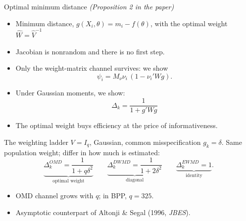 \documentclass[11pt,aspectratio=169]{beamer}
\begin{document}
\begin{frame}{Optimal minimum distance}
    \hypertarget{jump:p2}{}
    {\small\itshape (Proposition 2 in the paper)}\par\vspace{0.3em}
    \begin{itemize}\setlength{\itemsep}{0.7em}
    	\item Minimum distance, $g(X_i,\theta)=m_i-f(\theta)$, with the optimal weight
    	$\widehat W=\widehat V^{-1}$
    	\item Jacobian is nonrandom and
    	there is no first step.
        \item Only the \alert{weight-matrix channel} survives: we show
              \[\psi_i=M_\nu\nu_i\,(1-\nu_i'Wg).\]
        \item Under Gaussian moments, we show:
              \[
                  \Delta_k=\frac{1}{1+g'Wg}
              \]
         \item         \alert{The optimal weight buys efficiency at the price of informativeness.}
         
    \end{itemize}
    \end{frame}

\begin{frame}{The weighting ladder}
    $V=I_q$, Gaussian, common misspecification $g_k=\delta$. Same population
    weight; differ in how much is \alert{estimated}:
    \[
        \underbrace{\Delta_k^{OMD}=\frac{1}{1+q\delta^2}}_{\text{optimal weight}}
        \qquad
        \underbrace{\Delta_k^{DWMD}=\frac{1}{1+2\delta^2}}_{\text{diagonal}}
        \qquad
        \underbrace{\Delta_k^{EWMD}=1}_{\text{identity}}.
    \]
    \vspace{0.4em}
    \begin{itemize}\setlength{\itemsep}{0.4em}
        \item OMD channel \alert{grows with $q$}; \; in BPP, $q=325$.
        \item Asymptotic counterpart of Altonji \& Segal (1996, \textit{JBES}).
    \end{itemize}
\end{frame}
\end{document}
